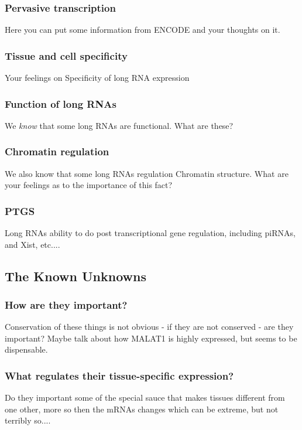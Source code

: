     \subsubsection{Pervasive transcription}
      Here you can put some information from ENCODE and your thoughts on it.

    \subsubsection{Tissue and cell specificity}
      Your feelings on Specificity of long RNA expression

    \subsubsection{Function of long RNAs}
      We \textit{know} that some long RNAs are functional. What are these?

    \subsubsection{Chromatin regulation}
      We also know that some long RNAs regulation Chromatin structure. What are your feelings as to the importance of this fact?

    \subsubsection{PTGS}
      Long RNAs ability to do post transcriptional gene regulation, including piRNAs, and Xist, etc....

  \subsection{The Known Unknowns}\label{subsec: The Known Unknowns}

    \subsubsection{How are they important?}
      Conservation of these things is not obvious - if they are not conserved - are they important? Maybe talk about how MALAT1 is highly expressed, but seems to be dispensable.

    \subsubsection{What regulates their tissue-specific expression?}
      Do they important some of the special sauce that makes tissues different from one other, more so then the mRNAs changes which can be extreme, but not terribly so....

